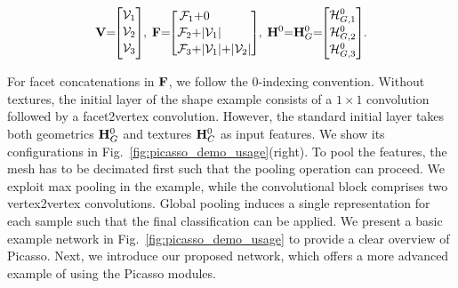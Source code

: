 \begin{equation}
{\bf V}{=\hspace{-1mm}}
\begin{bmatrix}
\mathcal{V}_1\vspace{.5mm}\\
\mathcal{V}_2\vspace{.5mm}\\
\mathcal{V}_3\vspace{.5mm}\\
\end{bmatrix}{\hspace{-.8mm},\hspace{1.5mm}}
{\bf F}{=\hspace{-1mm}}
\begin{bmatrix}
\mathcal{F}_1{+}0\phantom{+|\mathcal{V}_1|+}\vspace{.5mm}\\
\mathcal{F}_2{+}|\mathcal{V}_1|\phantom{+|\mathcal{V}_2|}\vspace{.5mm}\\
\mathcal{F}_3{+}|\mathcal{V}_1|{+}|\mathcal{V}_2|\\
\end{bmatrix}{\hspace{-.8mm},\hspace{1.5mm}}
{\bf H}^0{=}{\bf H}_G^0{=\hspace{-1mm}}
\begin{bmatrix}
\mathcal{H}_{G,1}^0\vspace{.5mm}\\
\mathcal{H}_{G,2}^0\vspace{.5mm}\\
\mathcal{H}_{G,3}^0\\
\end{bmatrix}{\hspace{-.8mm}.}
\end{equation}

For facet concatenations in ${\bf F}$, we follow the 0-indexing convention. 
Without textures, the initial layer of the shape example consists of a $1{\times}1$ convolution followed by a facet2vertex convolution. However, the standard initial layer takes both geometrics ${\bf H}_G^0$ and textures ${\bf H}_C^0$ as input features. We show its configurations in  Fig.~\ref{fig:picasso_demo_usage}(right).
To pool the features, the mesh has to be  decimated first such that the pooling operation can proceed. We exploit max pooling in the example, while the convolutional block comprises two vertex2vertex convolutions. 
Global pooling induces a single representation for each sample such that the final classification can be applied. 
We present a basic example network in Fig.~\ref{fig:picasso_demo_usage} to provide a clear overview of Picasso. Next, we introduce our proposed network, which offers a more advanced example of using the Picasso modules.

